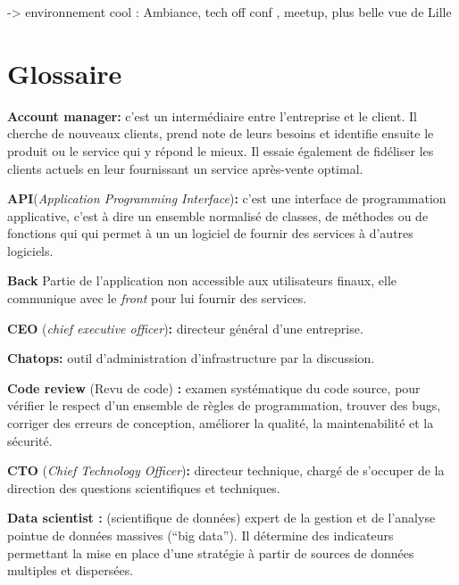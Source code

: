 \documentclass[12pt,a4paper]{article}
\begin{document}
  -\textgreater{} environnement cool : Ambiance, tech off conf , meetup,
  plus belle vue de Lille

  \newpage

  \section{Glossaire}\label{glossaire}

  \textbf{Account manager:} c'est un intermédiaire entre l'entreprise et
  le client. Il cherche de nouveaux clients, prend note de leurs besoins
  et identifie ensuite le produit ou le service qui y répond le mieux. Il
  essaie également de fidéliser les clients actuels en leur fournissant un
  service après-vente optimal.

  \bigskip

  \textbf{API}(\emph{Application Programming Interface})\textbf{:} c'est
  une interface de programmation applicative, c'est à dire un ensemble
  normalisé de classes, de méthodes ou de fonctions qui qui permet à un un
  logiciel de fournir des services à d'autres logiciels.

  \bigskip

  \textbf{Back} Partie de l'application non accessible aux utilisateurs
  finaux, elle communique avec le \emph{front} pour lui fournir des
  services.

  \bigskip

  \textbf{CEO} (\emph{chief executive officer})\textbf{:} directeur
  général d'une entreprise.

  \bigskip

  \textbf{Chatops:} outil d'administration d'infrastructure par la
  discussion.

  \bigskip

  \textbf{Code review} (Revu de code) \textbf{:} examen systématique du
  code source, pour vérifier le respect d'un ensemble de règles de
  programmation, trouver des bugs, corriger des erreurs de conception,
  améliorer la qualité, la maintenabilité et la sécurité.

  \bigskip

  \textbf{CTO} (\emph{Chief Technology Officer})\textbf{:} directeur
  technique, chargé de s'occuper de la direction des questions
  scientifiques et techniques.

  \bigskip

  \textbf{Data scientist :} (scientifique de données) expert de la gestion
  et de l'analyse pointue de données massives (``big data''). Il détermine
  des indicateurs permettant la mise en place d'une stratégie à partir de
  sources de données multiples et dispersées.
\end{document}

